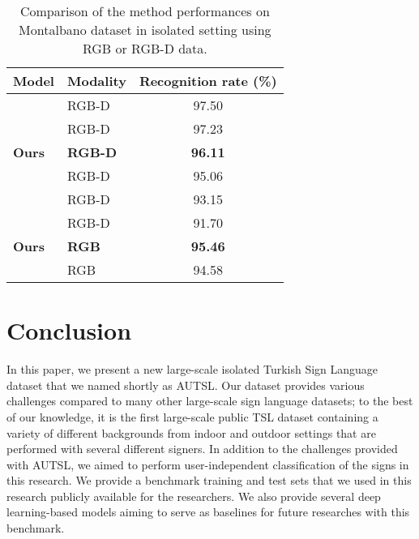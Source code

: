 \documentclass[11pt, a4paper, singlecolumn]{article}
\begin{document}
\begin{table}[t]
	\caption {Comparison of the method performances on Montalbano dataset in isolated setting using RGB or RGB-D data.}
	\centering
	\label{tab:montalbano_results}
	\begin{tabular}{ llc }
		\hline
		\textbf{Model} & \textbf{Modality}  & \textbf{Recognition rate (\%)} \\ \hline
		\cite{molchanov2016online}       & RGB-D & 97.50 \\  
		\cite{pigou2018beyond}  & RGB-D & 97.23 \\  
		\textbf{Ours}    & \textbf{RGB-D} &  \textbf{96.11}  \\ 		
		\cite{neverova2015moddrop} & RGB-D & 95.06 \\ 		
		\cite{sincan2019isolated}       & RGB-D & 93.15 \\ 
		\cite{pigou2014sign}       & RGB-D & 91.70 \\  \hline
		\textbf{Ours}      & \textbf{RGB} &  \textbf{95.46} \\
		\cite{santos2020238}    & RGB  & 94.58  \\ 	\hline
		
		
	\end{tabular}
\end{table}


\section{Conclusion}
\label{sec:conclusion}
In this paper, we present a new large-scale isolated Turkish Sign Language dataset that we named shortly as AUTSL. Our dataset provides various challenges compared to many other large-scale sign language datasets; to the best of our knowledge, it is the first large-scale public TSL dataset containing a variety of different backgrounds from indoor and outdoor settings that are performed with several different signers. In addition to the challenges provided with AUTSL, we aimed to perform user-independent classification of the signs in this research. We provide a benchmark training and test sets that we used in this research publicly available for the researchers. We also provide several deep learning-based models aiming to serve as baselines for future researches with this benchmark. 
\end{document}
